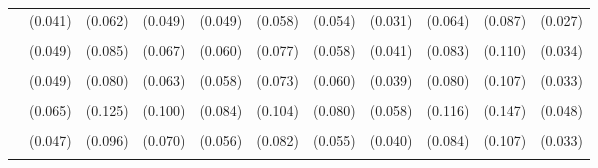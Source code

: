 \documentclass[3p, authoryear, review, doubleblind]{elsarticle} %
\begin{document}
\begin{landscape}
\begin{table}
{\begin{tabular}[t]{lcccccccccc}
 & (0.041) & (0.062) & (0.049) & (0.049) & (0.058) & (0.054) & (0.031) & (0.064) & (0.087) & (0.027)\\
\cellcolor{gray!6}{Basketball} & \cellcolor{gray!6}{-0.170 ***} & \cellcolor{gray!6}{-0.255 **} & \cellcolor{gray!6}{-0.503 ***} & \cellcolor{gray!6}{-0.411 ***} & \cellcolor{gray!6}{-0.230 **} & \cellcolor{gray!6}{-0.193 ***} & \cellcolor{gray!6}{-0.390 ***} & \cellcolor{gray!6}{-0.445 ***} & \cellcolor{gray!6}{-0.359 **} & \cellcolor{gray!6}{-0.261 ***}\\
 & (0.049) & (0.085) & (0.067) & (0.060) & (0.077) & (0.058) & (0.041) & (0.083) & (0.110) & (0.034)\\
\cellcolor{gray!6}{Baseball} & \cellcolor{gray!6}{0.097 *} & \cellcolor{gray!6}{0.200 *} & \cellcolor{gray!6}{0.148 *} & \cellcolor{gray!6}{0.163 **} & \cellcolor{gray!6}{0.226 **} & \cellcolor{gray!6}{-0.023} & \cellcolor{gray!6}{0.187 ***} & \cellcolor{gray!6}{0.162 *} & \cellcolor{gray!6}{0.153} & \cellcolor{gray!6}{0.125 ***}\\
 & (0.049) & (0.080) & (0.063) & (0.058) & (0.073) & (0.060) & (0.039) & (0.080) & (0.107) & (0.033)\\
\cellcolor{gray!6}{Football / Soccer} & \cellcolor{gray!6}{-0.282 ***} & \cellcolor{gray!6}{-0.731 ***} & \cellcolor{gray!6}{-0.595 ***} & \cellcolor{gray!6}{-0.630 ***} & \cellcolor{gray!6}{-0.689 ***} & \cellcolor{gray!6}{-0.178 *} & \cellcolor{gray!6}{-0.588 ***} & \cellcolor{gray!6}{-0.357 **} & \cellcolor{gray!6}{-0.514 ***} & \cellcolor{gray!6}{-0.482 ***}\\
 & (0.065) & (0.125) & (0.100) & (0.084) & (0.104) & (0.080) & (0.058) & (0.116) & (0.147) & (0.048)\\
\cellcolor{gray!6}{Tennis} & \cellcolor{gray!6}{0.417 ***} & \cellcolor{gray!6}{-0.428 ***} & \cellcolor{gray!6}{-0.067} & \cellcolor{gray!6}{0.305 ***} & \cellcolor{gray!6}{-0.211 **} & \cellcolor{gray!6}{0.560 ***} & \cellcolor{gray!6}{0.120 **} & \cellcolor{gray!6}{0.162 +} & \cellcolor{gray!6}{0.131} & \cellcolor{gray!6}{0.213 ***}\\
 & (0.047) & (0.096) & (0.070) & (0.056) & (0.082) & (0.055) & (0.040) & (0.084) & (0.107) & (0.033)\\
\cellcolor{gray!6}{Volleyball} & \cellcolor{gray!6}{0.080} & \cellcolor{gray!6}{-0.222} & \cellcolor{gray!6}{0.122} & \cellcolor{gray!6}{0.244 *} & \cellcolor{gray!6}{-0.184} & \cellcolor{gray!6}{0.286 **} & \cellcolor{gray!6}{0.009} & \cellcolor{gray!6}{-0.116} & \cellcolor{gray!6}{0.121} & \cellcolor{gray!6}{0.163 *}\\

\end{tabular}}
\end{table}
\end{landscape}
\end{document}
